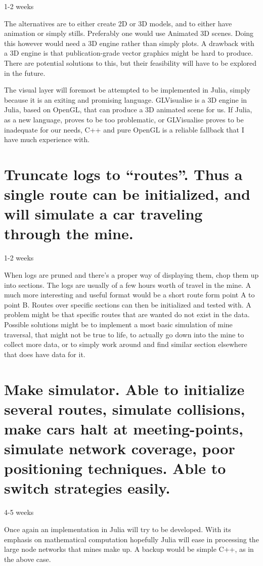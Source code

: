 \documentclass{article}
\begin{document}
    1-2 weeks
    
    The alternatives are to either create 2D or 3D models, and to either have animation or simply stills. Preferably one would use Animated 3D scenes. Doing this however would need a 3D engine rather than simply plots. A drawback with a 3D engine is that publication-grade vector graphics might be hard to produce. There are potential solutions to this, but their feasibility will have to be explored in the future.
    
    The visual layer will foremost be attempted to be implemented in Julia, simply because it is an exiting and promising language. GLVisualise is a 3D engine in Julia, based on OpenGL, that can produce a 3D animated scene for us. If Julia, as a new language, proves to be too problematic, or GLVisualise proves to be inadequate for our needs, C++ and pure OpenGL is a reliable fallback that I have much experience with.
    
    \section{Truncate logs to ``routes''. Thus a single route can be initialized, and will simulate a car traveling through the mine.}
    
    1-2 weeks
    
    When logs are pruned and there's a proper way of displaying them, chop them up into sections. The logs are usually of a few hours worth of travel in the mine. A much more interesting and useful format would be a short route form point A to point B. Routes over specific sections can then be initialized and tested with. A problem might be that specific routes that are wanted do not exist in the data. Possible solutions might be to implement a most basic simulation of mine traversal, that might not be true to life, to actually go down into the mine to collect more data, or to simply work around and find similar section elsewhere that does have data for it. 
    
    \section{Make simulator. Able to initialize several routes, simulate collisions, make cars halt at meeting-points, simulate network coverage, poor positioning techniques. Able to switch strategies easily.} 
    4-5 weeks
    
    Once again an implementation in Julia will try to be developed. With its emphasis on mathematical computation hopefully Julia will ease in processing the large node networks that mines make up. A backup would be simple C++, as in the above case.
    
\end{document}
